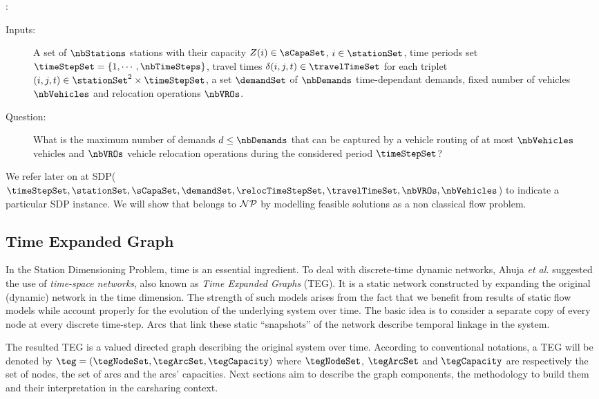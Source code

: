 \begin{bibunit}[ieeetr]
\noindent{\SDP}:
\begin{description}
\item[Inputs:] A set of $\nbStations$ stations with their capacity $Z(i) \in \sCapaSet$, $i \in \stationSet$, time periods set ${\timeStepSet = \{1, \cdots, \nbTimeSteps\}}$, travel times $\delta(i,j,t) \in \travelTimeSet$ for each triplet $(i,j,t)\in \stationSet^2 \times \timeStepSet$, a set $\demandSet$ of $\nbDemands$ time-dependant demands, fixed number of vehicles $\nbVehicles$ and relocation operations $\nbVROs$.
\item[Question:]
What is the maximum number of demands $d \leq \nbDemands$ that can be captured by a vehicle routing of at most $\nbVehicles$ vehicles and $\nbVROs$ vehicle relocation operations during the considered period $\timeStepSet$?
\end{description}
We refer later on at SDP($\timeStepSet, \stationSet, \sCapaSet, \demandSet, \relocTimeStepSet, \travelTimeSet, \nbVROs, \nbVehicles$) to indicate a particular SDP instance.
We will show that {\SDP} belongs to ${\cal NP}$ by modelling feasible solutions as a non classical flow problem.

\subsection{Time Expanded Graph}
In the Station Dimensioning Problem, time is an essential ingredient.
To deal with discrete-time dynamic networks, Ahuja {\em et al.} \cite{ahuja_network_1993} suggested the use of \emph{time-space networks}, also known as \emph{Time Expanded Graphs} (TEG). 
It is a static network constructed by expanding the original (dynamic) network in the time dimension.
The strength of such models arises from the fact that we benefit from results of static flow models while account properly for the evolution of the underlying system over time.
The basic idea is to consider a separate copy of every node at every discrete time-step. %
Arcs that link these static ``snapshots'' of the network describe temporal linkage in the system.

\medskip
The resulted TEG is a valued directed graph describing the original system over time.
According to conventional notations, a TEG will be denoted by $\teg = (\tegNodeSet, \tegArcSet, \tegCapacity)$ where $\tegNodeSet$, $\tegArcSet$ and $\tegCapacity$ are respectively the set of nodes, the set of arcs and the arcs' capacities.
Next sections aim to describe the graph components, the methodology to build them and their interpretation in the carsharing context.


\end{bibunit}
